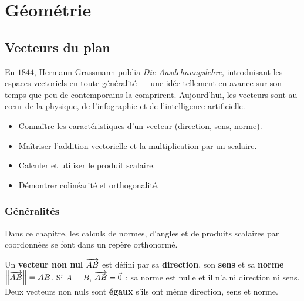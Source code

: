 \part{G\'eom\'etrie}

\chapter{Vecteurs du plan}


\begin{anecdote}
En $1844$, Hermann Grassmann publia \textit{Die Ausdehnungslehre}, introduisant
les espaces vectoriels en toute g\'en\'eralit\'e --- une id\'ee tellement en avance
sur son temps que peu de contemporains la comprirent. Aujourd'hui, les vecteurs
sont au c\oe ur de la physique, de l'infographie et de l'intelligence artificielle.
\end{anecdote}

\begin{objectifs}
\begin{itemize}
  \item Conna\^itre les caract\'eristiques d'un vecteur (direction, sens, norme).
  \item Ma\^itriser l'addition vectorielle et la multiplication par un scalaire.
  \item Calculer et utiliser le produit scalaire.
  \item D\'emontrer colin\'earit\'e et orthogonalit\'e.
\end{itemize}
\end{objectifs}

\section{G\'en\'eralit\'es}
Dans ce chapitre, les calculs de normes, d'angles et de produits scalaires
par coordonn\'ees se font dans un rep\`ere orthonorm\'e.

\begin{defn}[Vecteur]
Un \textbf{vecteur non nul} $\overrightarrow{AB}$ est d\'efini par sa \textbf{direction},
son \textbf{sens} et sa \textbf{norme} $\left\|\overrightarrow{AB}\right\| = AB$.
Si $A=B$, $\overrightarrow{AB}=\vec0$ : sa norme est nulle et il n'a ni direction ni sens.
Deux vecteurs non nuls sont \textbf{\'egaux} s'ils ont m\^{e}me direction, sens et norme.
\end{defn}

